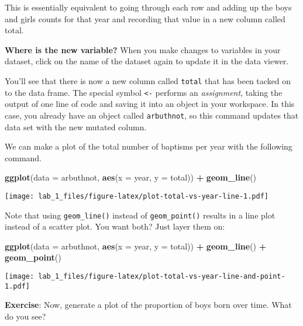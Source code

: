 \documentclass[
]{article}
\newenvironment{Shaded}{\begin{snugshade}}{\end{snugshade}}
\newcommand{\AttributeTok}[1]{\textcolor[rgb]{0.13,0.29,0.53}{#1}}
\newcommand{\FunctionTok}[1]{\textcolor[rgb]{0.13,0.29,0.53}{\textbf{#1}}}
\newcommand{\NormalTok}[1]{#1}
\newcommand{\SpecialCharTok}[1]{\textcolor[rgb]{0.81,0.36,0.00}{\textbf{#1}}}
\begin{document}
This is essentially equivalent to going through each row and adding up
the boys and girls counts for that year and recording that value in a
new column called total.

\label{boxedtext}
\textbf{Where is the new variable? } When you make changes to variables
in your dataset, click on the name of the dataset again to update it in
the data viewer.

You'll see that there is now a new column called \texttt{total} that has
been tacked on to the data frame. The special symbol
\texttt{\textless{}-} performs an \emph{assignment}, taking the output
of one line of code and saving it into an object in your workspace. In
this case, you already have an object called \texttt{arbuthnot}, so this
command updates that data set with the new mutated column.

We can make a plot of the total number of baptisms per year with the
following command.

\begin{Shaded}
\begin{Highlighting}[]
\FunctionTok{ggplot}\NormalTok{(}\AttributeTok{data =}\NormalTok{ arbuthnot, }\FunctionTok{aes}\NormalTok{(}\AttributeTok{x =}\NormalTok{ year, }\AttributeTok{y =}\NormalTok{ total)) }\SpecialCharTok{+}
  \FunctionTok{geom\_line}\NormalTok{()}
\end{Highlighting}
\end{Shaded}

\texttt{[image: lab\_1\_files/figure-latex/plot-total-vs-year-line-1.pdf]}

Note that using \texttt{geom\_line()} instead of \texttt{geom\_point()}
results in a line plot instead of a scatter plot. You want both? Just
layer them on:

\begin{Shaded}
\begin{Highlighting}[]
\FunctionTok{ggplot}\NormalTok{(}\AttributeTok{data =}\NormalTok{ arbuthnot, }\FunctionTok{aes}\NormalTok{(}\AttributeTok{x =}\NormalTok{ year, }\AttributeTok{y =}\NormalTok{ total)) }\SpecialCharTok{+}
  \FunctionTok{geom\_line}\NormalTok{() }\SpecialCharTok{+}
  \FunctionTok{geom\_point}\NormalTok{()}
\end{Highlighting}
\end{Shaded}

\texttt{[image: lab\_1\_files/figure-latex/plot-total-vs-year-line-and-point-1.pdf]}

\label{exercise}
\textbf{Exercise}: Now, generate a plot of the proportion of boys born
over time. What do you see?
\end{document}
